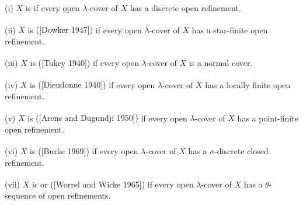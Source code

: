 \documentclass[prelim.tex]{subfiles}
\begin{document}
{ \label{def:1.1.8}
\textup{(i)}  $X$ is 
 if every open $\lambda$-cover of $X$ has a discrete open refinement.

\textup{(ii)} $X$ is 
 \textup{([Dowker 1947]\textsuperscript{\cite{Dowker}})}
 	 if every open $\lambda$-cover of $X$ has a star-finite open refinement.
 
\textup{(iii)} $X$ is 
\textup{([Tukey 1940]\textsuperscript{\cite{Tukey}})}
if every open $\lambda$-cover of $X$ is a normal cover.
 
\textup{(iv)} $X$ is 
\textup{([Dieudonne 1940]\textsuperscript{\cite{Dieudonne}})}
if every open $\lambda$-cover of $X$ has a locally finite open refinement.

\textup{(v)} $X$ is 
\textup{([Arens and Dugundji 1950]\textsuperscript{\cite{ArensDugundji}})}
if every open $\lambda$-cover of $X$ has a point-finite open refinement.

\textup{(vi)} $X$ is 
\textup{([Burke 1969]\textsuperscript{\cite{Burke}})}
if every open $\lambda$-cover of $X$ has a 
$\sigma$-discrete closed refinement.

\textup{(vii)} $X$ is 
or 
\textup{([Worrel and Wicke 1965]\textsuperscript{\cite{WorrellWicke}})}
   if every open $\lambda$-cover of $X$ has a $\theta$-sequence
  of open refinements.
} %
\end{document}
